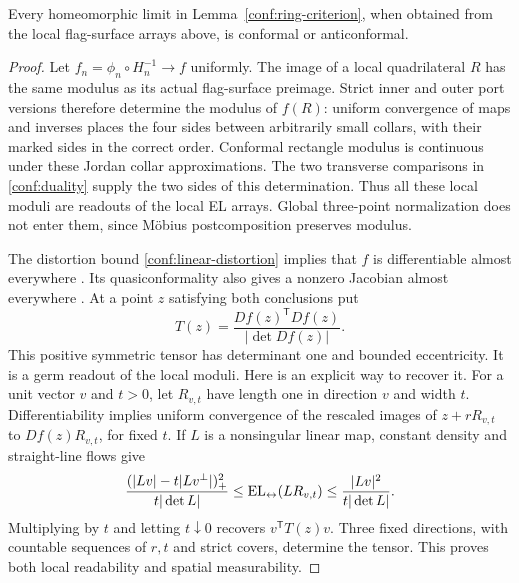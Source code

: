 \begin{lemma}
\label{conf:tensor}
Every homeomorphic limit in Lemma~\ref{conf:ring-criterion}, when
obtained from the local flag-surface arrays above, is conformal or
anticonformal.
\end{lemma}

\begin{proof}
Let \(f_n=\phi_n\circ H_n^{-1}\to f\) uniformly.  The image
of a local quadrilateral \(R\) has the same modulus as its actual
flag-surface preimage.  Strict inner and outer port versions
therefore determine the modulus of \(f(R)\): uniform convergence
of maps and inverses places the four sides between arbitrarily
small collars, with their marked sides in the correct order.
Conformal rectangle modulus is continuous under these Jordan
collar approximations.  The two transverse comparisons in
\eqref{conf:duality} supply the two sides of this determination.
Thus all these local moduli are readouts of the local EL arrays.
Global three-point normalization does not enter them, since
M\"obius postcomposition preserves modulus.

The distortion bound \eqref{conf:linear-distortion} implies that
\(f\) is differentiable almost everywhere
\cite[Lemma~2]{Cristea1989Quasiconformality}.  Its quasiconformality
also gives a nonzero Jacobian almost everywhere
\cite[Theorem~3.1.2]{AstalaIwaniecMartin2009}.
At a point \(z\) satisfying both conclusions put
\begin{equation}
 T(z)=\frac{Df(z)^{\mathsf T}Df(z)}{|\det Df(z)|}.
 \label{conf:tensor-definition}
\end{equation}
This positive symmetric tensor has determinant one and bounded
eccentricity.  It is a germ readout of the local moduli.  Here is
an explicit way to recover it.  For a unit vector \(v\) and
\(t>0\), let \(R_{v,t}\) have length one in direction \(v\)
and width \(t\).  Differentiability implies uniform convergence
of the rescaled images of \(z+rR_{v,t}\) to
\(Df(z)R_{v,t}\), for fixed \(t\).  If \(L\) is a nonsingular
linear map, constant density and straight-line flows give
\[
 \frac{(|Lv|-t|Lv^\perp|)_+^2}{t|\det L|}
 \le \operatorname{EL}_{\leftrightarrow}(LR_{v,t})
 \le \frac{|Lv|^2}{t|\det L|}.
\]
Multiplying by \(t\) and letting \(t\downarrow0\) recovers
\(v^{\mathsf T}T(z)v\).  Three fixed directions, with countable
sequences of \(r,t\) and strict covers, determine the tensor.
This proves both local readability and spatial measurability.


\end{proof}
